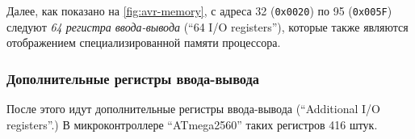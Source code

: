 \documentclass[../sparc.tex]{subfiles}
\begin{document}
Далее, как показано на \ref{fig:avr-memory}, с адреса 32
(\texttt{0x0020}) по 95 (\texttt{0x005F}) следуют \emph{64
регистра ввода-вывода} (``64 I/O registers''), которые также являются
отображением специализированной памяти процессора.

\subsubsection{Дополнительные регистры ввода-вывода}

После этого идут дополнительные регистры ввода-вывода (``Additional I/O
registers''.)  В микроконтроллере ``ATmega2560'' таких регистров 416
штук.\cite[22]{avr:atmega2560-datasheet}
\end{document}
